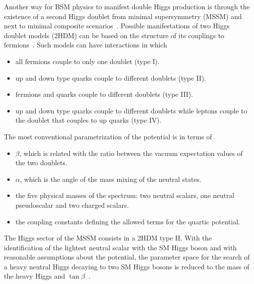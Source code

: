 %

Another way for BSM physics to manifest double Higgs production is through the existence of
a second Higgs doublet from minimal supersymmetry (MSSM) and next to minimal composite
scenarios~\cite{Barbieri:2013nka,2hdmextensions}.
Possible manifestations of two Higgs doublet models (2HDM) can be based on the structure
of its couplings to fermions~\cite{Branco:2011iw}. Such models can have interactions in which
\begin{itemize}
\item all fermions couple to only one doublet (type I).
\item up and down type quarks couple to different doublets (type II).
\item fermions and quarks couple to different doublets (type III).
\item up and down type quarks couple to different doublets while leptons couple to the doublet that couples to up quarks (type IV).
\end{itemize}
The most conventional parametrization of the potential is in terms of
\begin{itemize}
  \item $\beta$, which is related with the ratio between the vacuum expectation values of the two doublets. 
  \item $\alpha$, which is the angle of the mass mixing of the neutral states.%
  \item the five physical masses of the spectrum: two neutral scalars, one neutral pseudoscalar and two charged scalars.
  \item the coupling constants defining the allowed terms for the quartic potential.
\end{itemize} 

The Higgs sector of the MSSM consists in a 2HDM type II. 
With the identification of the lightest neutral scalar with the SM Higgs boson and with
reasonable assumptions about the potential, the parameter space for the search of a heavy neutral Higgs
decaying to two SM Higgs bosons
is reduced to the mass of the heavy Higgs and
$\tan \beta$~\cite{Branco:2011iw,Craig:2012vn,Craig:2013hca,Djouadi:2005gj}.%


